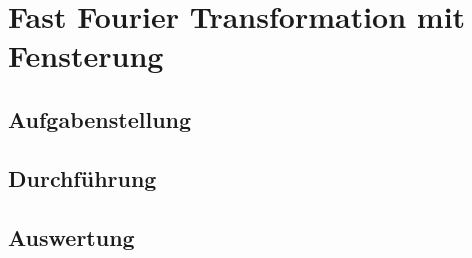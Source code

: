 \chapter{Fast Fourier Transformation mit Fensterung}\label{CFFTmF}
\section{Aufgabenstellung}\label{TFFTmF}
\section{Durchführung}\label{DFFTmF}
\section{Auswertung}\label{AFFTmF}